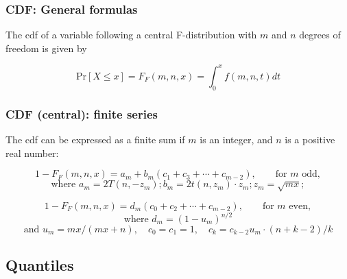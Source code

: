 \subsubsection{CDF: General formulas}
\label{FDistributionCDF}
The cdf of a variable following a central  F-distribution with $m$ and $n$ degrees of freedom is given by

\begin{equation}
	\text{Pr}\left[X \le x\right] = F_F\left(m,n,x\right) =  \int_{0}^{x} f(m,n,t) dt
\end{equation}




\subsubsection{CDF (central): finite series}
The cdf can be expressed as a finite sum if $m$ is an integer, and $n$ is a positive real number:

\begin{equation}
1-F_F\left(m,n,x\right) =  a_m + b_m(c_1 + c_3 +  \cdots +c_{m-2}), \qquad \text{for } m \text{ odd},
\end{equation}
\begin{equation}
\text{where } a_m=2T(n,-z_m); b_m=2t(n,z_m)\cdot z_m; z_m=\sqrt{mx};
\end{equation} 

\begin{equation}
1-F_F\left(m,n,x\right) =  d_m  (c_0 + c_2 +  \cdots +c_{m-2}), \qquad \text{for } m \text{ even},
\end{equation} 
\begin{equation}
\text{where } d_m=(1-u_m)^{n/2}
\end{equation} 
\begin{equation}
\text{and } u_m=mx/(mx+n), \quad c_0=c_1=1, \quad c_k=c_{k-2}u_m \cdot (n+k-2)/k
\end{equation} 





\subsection{Quantiles}
\label{FDistributionQuantiles}


